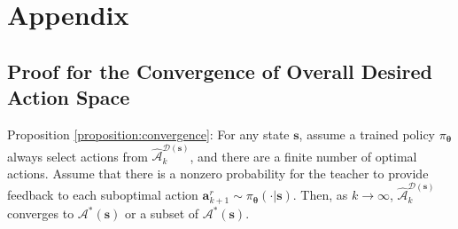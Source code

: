   
\section{Appendix}

\subsection{Proof for the Convergence of Overall Desired Action Space}
\label{appendix:proof_convergence_DesiredA}
Proposition \ref{proposition:convergence}:
   For any state $\bm s$, assume a trained policy $\pi_{\bm \theta}$ always select actions from $\hat{\mathcal{A}}^{\mathcal{D}(\bm s)}_k$,
   and there are a finite number of optimal actions.
   Assume that there is a nonzero probability for the teacher to provide feedback to each suboptimal action $\bm a^r_{k+1} \sim \pi_{\bm \theta}(\cdot | \bm s)$. 
    Then, as $k \rightarrow \infty$, $\hat{\mathcal{A}}^{\mathcal{D}(\bm s)}_k$ converges to $\mathcal{A}^*(\bm s)$ or a subset of $\mathcal{A}^*(\bm s)$.


